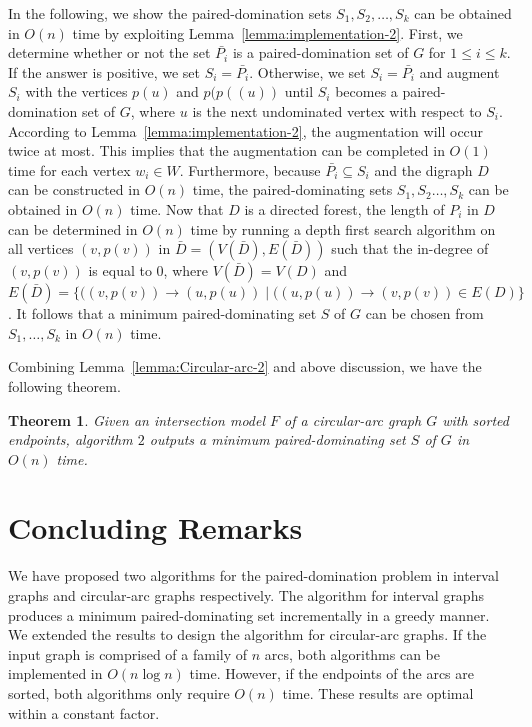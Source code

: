 \documentclass[12pt]{article}
\newtheorem{theorem}{Theorem}
\newcommand{\setof}[1]{\{{#1}\}}
\begin{document}
\medskip

In the following, we show the paired-domination sets $S_1, S_2,\ldots, S_k$ can be obtained in $O(n)$ time by exploiting Lemma~\ref{lemma:implementation-2}. First, we determine whether or not the set $\bar{P_i}$ is a paired-domination set of $G$ for $1 \le i \le k$. If the answer is positive, we set $S_i = \bar{P_i}$. Otherwise, we set $S_i = \bar{P_i}$ and augment $S_i$ with the vertices $p(u)$ and $p(p((u))$ until $S_i$ becomes a
paired-domination set of $G$, where $u$ is the next undominated
vertex with respect to $S_i$. According to
Lemma~\ref{lemma:implementation-2}, the augmentation will occur twice at most. This implies that the augmentation can be
completed in $O(1)$ time for each vertex $w_i \in W$. Furthermore,
because $\bar{P_i} \subseteq S_i$ and the digraph $D$ can be
constructed in $O(n)$ time, the paired-dominating sets
$S_1,S_2\ldots,S_k$ can be obtained in $O(n)$ time. Now that $D$
is a directed forest, the length of $P_i$ in $D$ can be determined
in $O(n)$ time by running a depth first search algorithm on all
vertices $(v, p(v))$ in $\bar{D} = (V(\bar{D}), E(\bar{D}))$ such
that the in-degree of $(v, p(v))$ is equal to $0$, where
$V(\bar{D}) = V(D)$ and $E(\bar{D}) = \setof{ ((v,p(v))\rightarrow
(u,p(u)) \mid ((u,p(u))\rightarrow (v,p(v)) \in E(D)} $. It
follows that a minimum paired-dominating set $S$ of $G$ can be
chosen from $S_1,\ldots,S_k$ in $O(n)$ time.


Combining Lemma~\ref{lemma:Circular-arc-2} and above discussion,
we have the following theorem.

\begin{theorem} \label{theorem:interval} Given an intersection
model $F$ of a circular-arc graph $G$ with sorted endpoints,
algorithm $2$ outputs a minimum paired-dominating set $S$
of $G$ in $O(n)$ time.
\end{theorem}

\section{Concluding Remarks  \label{section:conclusion}}
We have proposed two algorithms for the paired-domination problem in interval graphs and circular-arc graphs respectively. The algorithm for interval graphs produces a minimum paired-dominating set incrementally in a greedy manner. We extended the results to design the algorithm for circular-arc graphs. If the input graph is comprised of a family of $n$ arcs, both algorithms can be implemented in $O(n \log n)$ time. However, if the endpoints of the arcs are sorted, both algorithms only require $O(n)$ time. These results are optimal within a constant factor.
\end{document}
